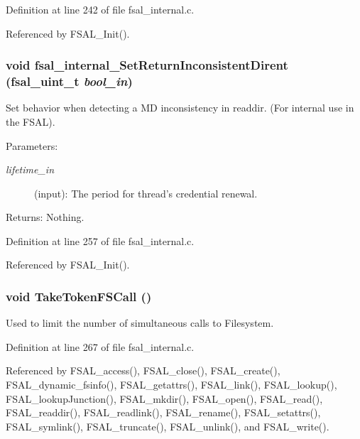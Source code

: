 Definition at line 242 of file fsal\_\-internal.c.

Referenced by FSAL\_\-Init().
\subsubsection{\setlength{\rightskip}{0pt plus 5cm}void fsal\_\-internal\_\-Set\-Return\-Inconsistent\-Dirent (fsal\_\-uint\_\-t {\em bool\_\-in})}\label{fsal__internal_8c_a17}


Set behavior when detecting a MD inconsistency in readdir. (For internal use in the FSAL).

\begin{Desc}
\item[Parameters:]
\begin{description}
\item[{\em lifetime\_\-in}](input): The period for thread's credential renewal.\end{description}
\end{Desc}
\begin{Desc}
\item[Returns:]Nothing. \end{Desc}


Definition at line 257 of file fsal\_\-internal.c.

Referenced by FSAL\_\-Init().
\subsubsection{\setlength{\rightskip}{0pt plus 5cm}void Take\-Token\-FSCall ()}\label{fsal__internal_8c_a18}


Used to limit the number of simultaneous calls to Filesystem. 

Definition at line 267 of file fsal\_\-internal.c.

Referenced by FSAL\_\-access(), FSAL\_\-close(), FSAL\_\-create(), FSAL\_\-dynamic\_\-fsinfo(), FSAL\_\-getattrs(), FSAL\_\-link(), FSAL\_\-lookup(), FSAL\_\-lookup\-Junction(), FSAL\_\-mkdir(), FSAL\_\-open(), FSAL\_\-read(), FSAL\_\-readdir(), FSAL\_\-readlink(), FSAL\_\-rename(), FSAL\_\-setattrs(), FSAL\_\-symlink(), FSAL\_\-truncate(), FSAL\_\-unlink(), and FSAL\_\-write().